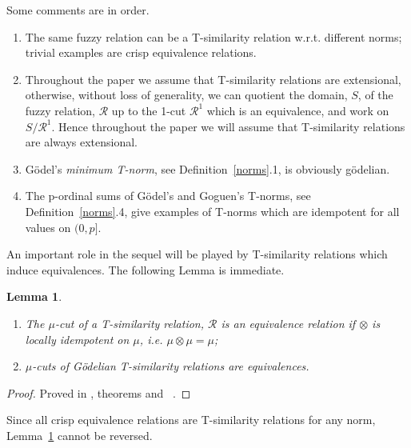 \documentclass{article}
\def\ie{{\em i.e. }}
\newcommand{\cR}{{\mathcal R}}
\newtheorem{lemma}{Lemma}[section]
\begin{document}
Some comments are in order.
\begin{enumerate}
\item The same fuzzy relation can be a T-similarity relation w.r.t. different norms; trivial examples are crisp equivalence relations. 
\item Throughout the paper we assume that T-similarity relations are extensional, otherwise, without loss of generality, we can quotient the domain, $S$, of the fuzzy relation, $\cR$ up to the 1-cut $\cR^1$ which is an equivalence, and work on $S/\cR^1$. Hence throughout the paper we will assume that T-similarity relations are always extensional.
\item G\"odel's {\em minimum T-norm}, see Definition~\ref{norms}.1, is obviously g\"odelian.
\item The p-ordinal sums of G\"odel's and Goguen's T-norms, see Definition~\ref{norms}.4, give examples of T-norms which are idempotent for all values on $(0,p]$.
\end{enumerate}
An important role in the sequel will be played by T-similarity relations which induce equivalences.
The following Lemma is immediate.
\begin{lemma}\label{T-equivalence}\hfill \begin{enumerate} 
\item The $\mu$-cut of a T-similarity relation, $\cR$ is an equivalence relation if $\otimes$ is locally idempotent on $\mu$, \ie 
$\mu\otimes\mu=\mu$;
\item $\mu$-cuts of G\"odelian T-similarity relations are equivalences.
\end{enumerate}
\end{lemma}
{\color{blue}\begin{proof}
\begin{sloppypar}\raggedright
Proved in , theorems
 and ~\cite{OurRocqRepo}.
\end{sloppypar}
\end{proof}}

Since all crisp equivalence relations are T-similarity relations for any norm, Lemma~\ref{T-equivalence} cannot be reversed. 
\end{document}
